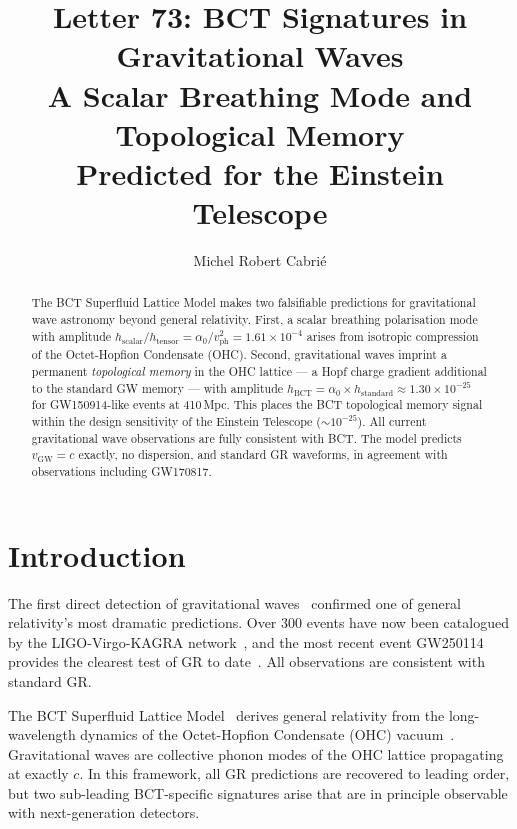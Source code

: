 \documentclass[aps,prl,twocolumn,superscriptaddress,showpacs]{revtex4-2}
\begin{document}
\title{Letter 73: BCT Signatures in Gravitational Waves\\
\large A Scalar Breathing Mode and Topological Memory\\
Predicted for the Einstein Telescope}

\author{Michel Robert Cabri\'{e}}

\begin{abstract}
The BCT Superfluid Lattice Model makes two falsifiable predictions 
for gravitational wave astronomy beyond general relativity. First, 
a scalar breathing polarisation mode with amplitude 
$h_\mathrm{scalar}/h_\mathrm{tensor} = \alpha_0/v_\mathrm{ph}^2 
= 1.61\times10^{-4}$ arises from isotropic compression of the 
Octet-Hopfion Condensate (OHC). Second, gravitational waves imprint 
a permanent \emph{topological memory} in the OHC lattice — a Hopf 
charge gradient additional to the standard GW memory — with amplitude 
$h_\mathrm{BCT} = \alpha_0 \times h_\mathrm{standard} \approx 
1.30\times10^{-25}$ for GW150914-like events at 410\,Mpc. This places 
the BCT topological memory signal within the design sensitivity of the 
Einstein Telescope ($\sim10^{-25}$). All current gravitational wave 
observations are fully consistent with BCT. The model predicts 
$v_\mathrm{GW} = c$ exactly, no dispersion, and standard GR waveforms, 
in agreement with observations including GW170817.
\end{abstract}

\maketitle

\section{Introduction}

The first direct detection of gravitational waves~\cite{GW150914} 
confirmed one of general relativity's most dramatic predictions. 
Over 300 events have now been catalogued by the LIGO-Virgo-KAGRA 
network~\cite{GWTC3}, and the most recent event GW250114 provides 
the clearest test of GR to date~\cite{GW250114}. All observations 
are consistent with standard GR.

The BCT Superfluid Lattice Model~\cite{BCT_Monograph} derives 
general relativity from the long-wavelength dynamics of the 
Octet-Hopfion Condensate (OHC) vacuum~\cite{BCT_AppJH}. 
Gravitational waves are collective phonon modes of the OHC 
lattice propagating at exactly $c$. In this framework, all GR 
predictions are recovered to leading order, but two sub-leading 
BCT-specific signatures arise that are in principle observable 
with next-generation detectors.
\end{document}
